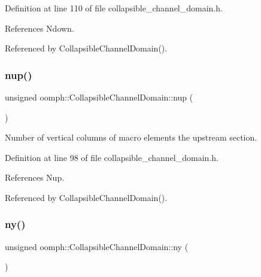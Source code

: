 Definition at line 110 of file collapsible\+\_\+channel\+\_\+domain.\+h.



References Ndown.



Referenced by Collapsible\+Channel\+Domain().

\mbox{\label{classoomph_1_1CollapsibleChannelDomain_a7e098bcffc76332af4ca220701fd32e2}} 
\subsubsection{\texorpdfstring{nup()}{nup()}}
{\footnotesize\ttfamily unsigned oomph\+::\+Collapsible\+Channel\+Domain\+::nup (\begin{DoxyParamCaption}{ }\end{DoxyParamCaption})\hspace{0.3cm}{\ttfamily [inline]}}



Number of vertical columns of macro elements the upstream section. 



Definition at line 98 of file collapsible\+\_\+channel\+\_\+domain.\+h.



References Nup.



Referenced by Collapsible\+Channel\+Domain().

\mbox{\label{classoomph_1_1CollapsibleChannelDomain_a62e15782984f3d5e10ba44a6d8ad06ee}} 
\subsubsection{\texorpdfstring{ny()}{ny()}}
{\footnotesize\ttfamily unsigned oomph\+::\+Collapsible\+Channel\+Domain\+::ny (\begin{DoxyParamCaption}{ }\end{DoxyParamCaption})\hspace{0.3cm}{\ttfamily [inline]}}



